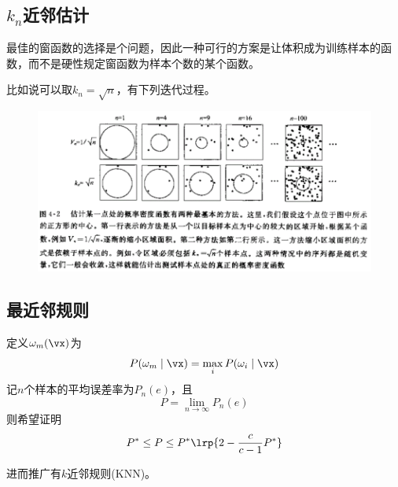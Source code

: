 \subsection{$k_n$近邻估计}
最佳的窗函数的选择是个问题，因此一种可行的方案是让体积成为训练样本的函数，而不是硬性规定窗函数为样本个数的某个函数。

比如说可以取$k_n=\sqrt{n}$，有下列迭代过程。
\begin{figure}[H]
\centering
\includegraphics[width=0.8\linewidth]{fig/kn-neighbor.png}
\end{figure}

\subsection{最近邻规则}
定义$\omega_m(\vx)$为
\[P(\omega_m\mid\vx)=\max_i P(\omega_i\mid\vx)\]
记$n$个样本的平均误差率为$P_n(e)$，且
\[P=\lim_{n\to\infty}P_n(e)\]
则希望证明
\[P^*\leq P\leq P^*\lrp{2-\frac{c}{c-1}P^*}\]

进而推广有$k$近邻规则(KNN)。